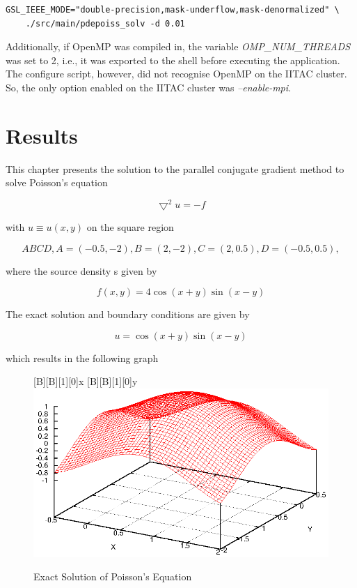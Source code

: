 \documentclass[12pt,a4paper]{report}
\begin{document}
\begin{verbatim}
GSL_IEEE_MODE="double-precision,mask-underflow,mask-denormalized" \
    ./src/main/pdepoiss_solv -d 0.01
\end{verbatim}

Additionally, if OpenMP was compiled in, the variable
\textit{OMP\_NUM\_THREADS} was set to 2, i.e., it was exported to the
shell before executing the application. The configure script, however,
did not recognise OpenMP on the IITAC cluster. So, the only option
enabled on the IITAC cluster was \textit{--enable-mpi}.

\chapter{Results}
\label{cha:results}

This chapter presents the solution to the parallel conjugate gradient
method to solve Poisson's equation

\begin{equation}
  \label{eq:poisson}
  \bigtriangledown^{2}u=-f
\end{equation}

with $u\equiv u(x,y)$ on the square region

\begin{equation}
  \label{eq:squareRegion}
  ABCD, A=(-0.5,-2), B=(2,-2), C=(2,0.5), D=(-0.5,0.5),
\end{equation}

where the source density s given by

\begin{equation}
  \label{eq:sourceDensity}
  f(x,y)=4\cos(x+y)\sin(x-y)
\end{equation}

The exact solution and boundary conditions are given by

\begin{equation}
  \label{eq:boundaryCond}
  u=\cos(x+y)\sin(x-y)
\end{equation}

which results in the following graph

\begin{figure}[htb]
  \centering
  [B][B][1][0]{x}
  [B][B][1][0]{y}
  \includegraphics[scale=0.5]{./images/exact.eps}
  \caption{Exact Solution of Poisson's Equation}
  \label{fig:exactPoiss}
\end{figure}
\end{document}
